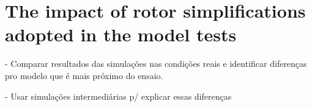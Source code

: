 \section{The impact of rotor simplifications adopted in the model tests} \label{sec:impact_simplifications}
- Comparar resultados das simulações nas condições reais e identificar diferenças pro modelo que é mais próximo do ensaio.

- Usar simulações intermediárias p/ explicar essas diferenças

%
